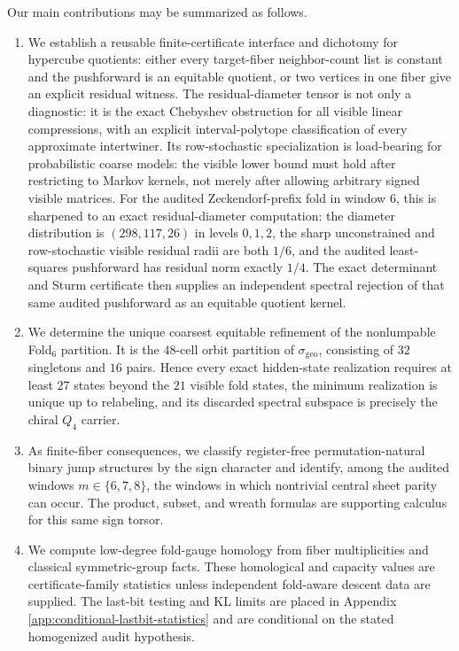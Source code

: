 \documentclass[12pt,a4paper]{article}
\theoremstyle{plain}
\theoremstyle{definition}
\numberwithin{equation}{section}
\begin{document}
Our main contributions may be summarized as follows.
\begin{enumerate}[label=(\roman*)]
\item We establish a reusable finite-certificate interface and dichotomy for hypercube quotients: either every target-fiber neighbor-count list is constant and the pushforward is an equitable quotient, or two vertices in one fiber give an explicit residual witness.  The residual-diameter tensor is not only a diagnostic: it is the exact Chebyshev obstruction for all visible linear compressions, with an explicit interval-polytope classification of every approximate intertwiner.  Its row-stochastic specialization is load-bearing for probabilistic coarse models: the visible lower bound must hold after restricting to Markov kernels, not merely after allowing arbitrary signed visible matrices.  For the audited Zeckendorf-prefix fold in window \(6\), this is sharpened to an exact residual-diameter computation: the diameter distribution is \((298,117,26)\) in levels \(0,1,2\), the sharp unconstrained and row-stochastic visible residual radii are both \(1/6\), and the audited least-squares pushforward has residual norm exactly \(1/4\).  The exact determinant and Sturm certificate then supplies an independent spectral rejection of that same audited pushforward as an equitable quotient kernel.
\item We determine the unique coarsest equitable refinement of the nonlumpable Fold\(_6\) partition.  It is the \(48\)-cell orbit partition of \(\sigma_{\mathrm{geo}}\), consisting of \(32\) singletons and \(16\) pairs.  Hence every exact hidden-state realization requires at least \(27\) states beyond the \(21\) visible fold states, the minimum realization is unique up to relabeling, and its discarded spectral subspace is precisely the chiral \(Q_4\) carrier.
\item As finite-fiber consequences, we classify register-free permutation-natural binary jump structures by the sign character and identify, among the audited windows \(m\in\{6,7,8\}\), the windows in which nontrivial central sheet parity can occur.  The product, subset, and wreath formulas are supporting calculus for this same sign torsor.
\item We compute low-degree fold-gauge homology from fiber multiplicities and classical symmetric-group facts.  These homological and capacity values are certificate-family statistics unless independent fold-aware descent data are supplied.  The last-bit testing and KL limits are placed in Appendix \ref{app:conditional-lastbit-statistics} and are conditional on the stated homogenized audit hypothesis.
\end{enumerate}
\end{document}
